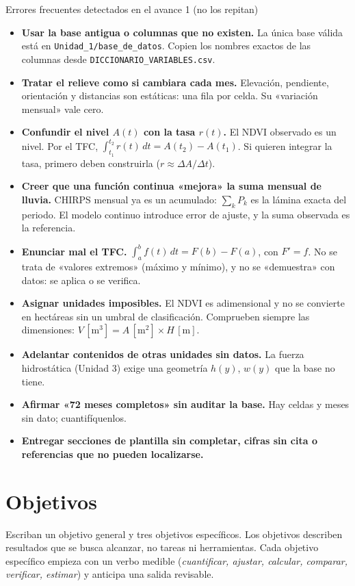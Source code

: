 \documentclass[11pt,a4paper]{article}
\begin{document}
\begin{alerta}{Errores frecuentes detectados en el avance 1 (no los repitan)}
\begin{itemize}
  \item \textbf{Usar la base antigua o columnas que no existen.} La única base válida está en \texttt{Unidad\_1/base\_de\_datos}. Copien los nombres exactos de las columnas desde \texttt{DICCIONARIO\_VARIABLES.csv}.
  \item \textbf{Tratar el relieve como si cambiara cada mes.} Elevación, pendiente, orientación y distancias son estáticas: una fila por celda. Su «variación mensual» vale cero.
  \item \textbf{Confundir el nivel $A(t)$ con la tasa $r(t)$.} El NDVI observado es un nivel. Por el TFC, $\int_{t_1}^{t_2} r(t)\,dt=A(t_2)-A(t_1)$. Si quieren integrar la tasa, primero deben construirla ($r\approx\Delta A/\Delta t$).
  \item \textbf{Creer que una función continua «mejora» la suma mensual de lluvia.} CHIRPS mensual ya es un acumulado: $\sum_k P_k$ es la lámina exacta del periodo. El modelo continuo introduce error de ajuste, y la suma observada es la referencia.
  \item \textbf{Enunciar mal el TFC.} $\int_a^b f(t)\,dt=F(b)-F(a)$, con $F'=f$. No se trata de «valores extremos» (máximo y mínimo), y no se «demuestra» con datos: se aplica o se verifica.
  \item \textbf{Asignar unidades imposibles.} El NDVI es adimensional y no se convierte en hectáreas sin un umbral de clasificación. Comprueben siempre las dimensiones: $V\,[\mathrm{m}^3]=A\,[\mathrm{m}^2]\times H\,[\mathrm{m}]$.
  \item \textbf{Adelantar contenidos de otras unidades sin datos.} La fuerza hidrostática (Unidad 3) exige una geometría $h(y)$, $w(y)$ que la base no tiene.
  \item \textbf{Afirmar «72 meses completos» sin auditar la base.} Hay celdas y meses sin dato; cuantifíquenlos.
  \item \textbf{Entregar secciones de plantilla sin completar, cifras sin cita o referencias que no pueden localizarse.}
\end{itemize}
\end{alerta}

\section{Objetivos}
Escriban un objetivo general y tres objetivos específicos. Los objetivos describen resultados que se busca alcanzar, no tareas ni herramientas. Cada objetivo específico empieza con un verbo medible (\emph{cuantificar, ajustar, calcular, comparar, verificar, estimar}) y anticipa una salida revisable.
\end{document}
